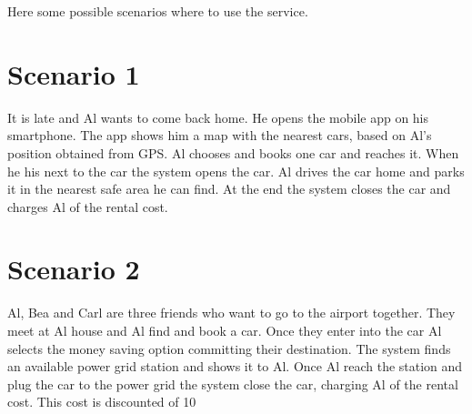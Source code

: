 Here some possible scenarios where to use the service.
\section{Scenario 1}
It is late and Al wants to come back home. He opens the mobile app on his smartphone. The app shows him a map with the nearest cars, based on Al's position obtained from GPS. Al chooses and books one car and reaches it. When he his next to the car the system opens the car.
Al drives the car home and parks it in the nearest safe area he can find. At the end the system closes the car and charges Al of the rental cost.
\section{Scenario 2}
Al, Bea and Carl are three friends who want to go to the airport together. They meet at Al house and Al find and book a car. Once they enter into the car Al selects the money saving option committing their destination. The system finds an available power grid station and shows it to Al. Once Al reach the station and plug the car to the power grid the system close the car, charging Al of the rental cost.
This cost is discounted of 10%
